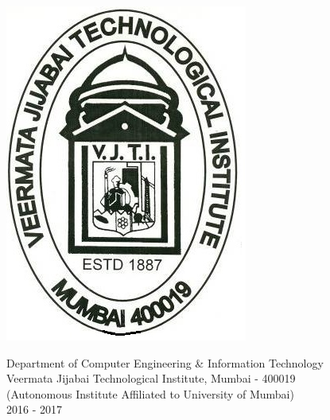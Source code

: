 \documentclass[oneside,11pt]{Classes/CUEDthesisPSnPDF}
\theoremstyle{definition}
\begin{document}
\begin{titlepage}
\begin{center}\includegraphics[scale=0.3]{VJTIM.jpg}\end{center}
\vspace*{1\baselineskip}

\begin{center}
\begin{Large}
Department of Computer Engineering \& Information Technology\\
Veermata Jijabai Technological Institute, Mumbai - 400019\\  
(Autonomous Institute Affiliated to University of Mumbai)\\
2016 - 2017
\end{Large}
\end{center}
\end{titlepage}
\end{document}
